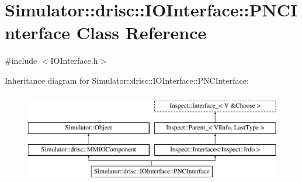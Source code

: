 \hypertarget{class_simulator_1_1drisc_1_1_i_o_interface_1_1_p_n_c_interface}{\section{Simulator\+:\+:drisc\+:\+:I\+O\+Interface\+:\+:P\+N\+C\+Interface Class Reference}
\label{class_simulator_1_1drisc_1_1_i_o_interface_1_1_p_n_c_interface}
}


{\ttfamily \#include $<$I\+O\+Interface.\+h$>$}

Inheritance diagram for Simulator\+:\+:drisc\+:\+:I\+O\+Interface\+:\+:P\+N\+C\+Interface\+:\begin{figure}[H]
\begin{center}
\leavevmode
\includegraphics[height=4.000000cm]{class_simulator_1_1drisc_1_1_i_o_interface_1_1_p_n_c_interface}
\end{center}
\end{figure}
